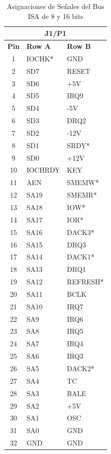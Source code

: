 \documentclass[12pt]{article}
\begin{document}
\begin{enumerate}
\begin{table}[h!]
\begin{minipage}{.48\textwidth}
\begin{tabular}{|c|l|l|}
					\hline 
					\multicolumn{3}{|c|}{\textbf{J1/P1}} \\
					\hline 
					\textbf{Pin} & \textbf{Row A} & \textbf{Row B} \\
					\hline 
					1 & IOCHK* & GND \\
					\hline 
					2 & SD7 & RESET \\
					\hline 
					3 & SD6 & +5V \\
					\hline 
					4 & SD5 & IRQ9 \\
					\hline 
					5 & SD4 & -5V \\
					\hline 
					6 & SD3 & DRQ2 \\
					\hline 
					7 & SD2 & -12V \\
					\hline
					8 & SD1 & SRDY* \\
					\hline
					9 & SD0 & +12V \\
					\hline 
					10 & IOCHRDY & KEY \\
					\hline 
					11 & AEN & SMEMW* \\
					\hline 
					12 & SA19 & SMEMR* \\
					\hline 
					13 & SA18 & IOW* \\
					\hline
					14 & SA17 & IOR* \\
					\hline 
					15 & SA16 & DACK3* \\
					\hline
					16 & SA15 & DRQ3 \\
					\hline 
					17 & SA14 & DACK1* \\
					\hline 
					18 & SA13 & DRQ1 \\
					\hline 
					19 & SA12 & REFRESH* \\
					\hline 
					20 & SA11 & BCLK \\
					\hline 
					21 & SA10 & IRQ7 \\
					\hline 
					22 & SA9 & IRQ6 \\
					\hline
					23 & SA8 & IRQ5 \\
					\hline 
					24 & SA7 & IRQ4 \\
					\hline 
					25 & SA6 & IRQ3 \\
					\hline 
					26 & SA5 & DACK2* \\
					\hline 
					27 & SA4 & TC \\
					\hline
					28 & SA3 & BALE \\
					\hline 
					29 & SA2 & +5V \\
					\hline 
					30 & SA1 & OSC \\
					\hline 
					31 & SA0 & GND \\
					\hline 
					32 & GND & GND \\
					\hline 
				\end{tabular}
			\end{minipage}
			\caption{Asignaciones de Señales del Bus ISA de 8 y 16 bits}
		\end{table}
	\end{enumerate}
	
\end{document}
